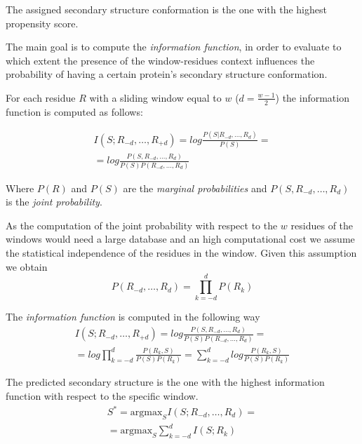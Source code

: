 \documentclass[a4paper,twocolumn]{article}
\begin{document}
The assigned secondary structure conformation is the one with the highest propensity score.

The main goal is to compute the \emph{information function}, in order to evaluate to which
extent the presence of the window-residues context influences the probability of
having a certain protein's secondary structure conformation.

For each residue \(R\) with a sliding window equal to \(w\) (\(d=\frac{w-1}{2}\)) the
information function is computed as follows:

 \begin{equation} \begin{split} I(S; R_{- d}, \dots, R_{+d} ) =
log \frac{P(S|R_{-d}, \dots , R_{d})}{P(S)} =\\ = log
\frac{P(S,R_{-d}, \dots , R_{d})}{P(S)P(R_{-d}, \dots, R_{d})} \end{split} \end{equation}

Where \(P(R)\) and \(P(S)\) are the \emph{marginal probabilities} and \(P(S,R_{-d}, \dots ,
R_{d})\) is the \emph{joint probability}.

As the computation of the joint probability with respect to the \(w\) residues of the windows would need a large database and an high computational cost we assume the statistical independence of the residues in the window. Given this assumption we obtain
\begin{equation} P(R_{-d}, \dots, R_{d}) = \prod^{d}_{k=-d}P(R_{k}) \end{equation}

The \emph{information function} is computed in the following way
\begin{equation}\begin{split} I(S; R_{- d}, \dots, R_{+d} )  = log \frac{P(S,R_{-d}, \dots , R_{d})}{P(S)P(R_{-d}, \dots, R_{d})} = \\ = log \prod_{k=-d}^{d} \frac{P(R_{k}, S)}{P(S)P(R_{k})} = \sum_{k=-d}^{d} log  \frac{P(R_{k}, S)}{P(S)P(R_{k})} \end{split}\end{equation}

The predicted secondary structure is the one with the highest information
function with respect to the specific window.
\begin{equation} \begin{split}S^{*} = \text{argmax}_{S}I(S; R_{-d}, \dots, R_{d}) = \\ = \text{argmax}_{S}\sum^{d}_{k=-d} I(S;R_{k}) \end{split}\end{equation}
\end{document}
